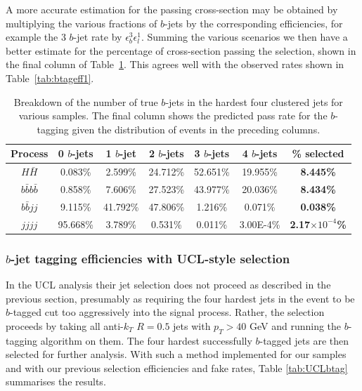 \documentclass[12pt]{article}
\begin{document}
 A more accurate estimation for the passing cross-section may be obtained by multiplying the various fractions of $b$-jets by the corresponding efficiencies, for example the 3 $b$-jet rate by $\epsilon_b^{3}\epsilon_l^{1}$. Summing the various scenarios we then have a better estimate for the percentage of cross-section passing the selection, shown in the final column of Table~\ref{tab:nbjets}. This agrees well with the observed rates shown in Table~\ref{tab:btageff1}.


\begin{table}[htdp]
\begin{center}
\begin{tabular}{|c|c|c|c|c|c||c|}
\hline
Process & 0 $b$-jets & 1 $b$-jet & 2 $b$-jets & 3 $b$-jets & 4 $b$-jets & \% selected \\
\hline\hline
$H\bar{H}$ & 0.083\% & 2.599\% &  24.712\% &   52.651\% &  19.955\% & \textbf{8.445\%}\\
\hline
$b\bar{b}b\bar{b}$ & 0.858\% &  7.606\% &  27.523\% &  43.977\% &   20.036\% & \textbf{8.434\%} \\
$b\bar{b}jj$ & 9.115\% &    41.792\% &    47.806\% &     1.216\% &  0.071\% & \textbf{0.038\%}\\
$jjjj$ & 95.668\% &   3.789\% &  0.531\% & 0.011\%  & 3.00E-4\%& \textbf{2.17$\times 10^{-4}$\%}\\
\hline
\end{tabular}
\end{center}
\caption{Breakdown of the number of true $b$-jets in the hardest four clustered jets for various samples. The final column shows the predicted pass rate for the $b$-tagging given the distribution of events in the preceding columns.}\label{tab:nbjets}
\end{table}%

\subsubsection{$b$-jet tagging efficiencies with UCL-style selection}
In the UCL analysis their jet selection does not proceed as described in the previous section, presumably as requiring the four hardest jets in the event to be $b$-tagged cut too aggressively into the signal process. Rather, the selection proceeds by taking all anti-$k_T$ $R=0.5$ jets with $p_T > 40$ GeV and running the $b$-tagging algorithm on them. The four hardest successfully $b$-tagged jets are then selected for further analysis. With such a method implemented for our samples and with our previous selection efficiencies and fake rates, Table \ref{tab:UCLbtag} summarises the results.
\end{document}
